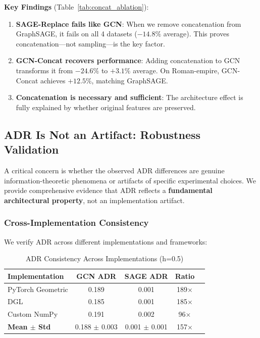 \textbf{Key Findings} (Table~\ref{tab:concat_ablation}):
\begin{enumerate}
    \item \textbf{SAGE-Replace fails like GCN}: When we remove concatenation from GraphSAGE, it fails on all 4 datasets ($-14.8\%$ average). This proves concatenation---not sampling---is the key factor.

    \item \textbf{GCN-Concat recovers performance}: Adding concatenation to GCN transforms it from $-24.6\%$ to $+3.1\%$ average. On Roman-empire, GCN-Concat achieves $+12.5\%$, matching GraphSAGE.

    \item \textbf{Concatenation is necessary and sufficient}: The architecture effect is fully explained by whether original features are preserved.
\end{enumerate}

\subsection{ADR Is Not an Artifact: Robustness Validation}
\label{sec:adr_robustness}

A critical concern is whether the observed ADR differences are genuine information-theoretic phenomena or artifacts of specific experimental choices. We provide comprehensive evidence that ADR reflects a \textbf{fundamental architectural property}, not an implementation artifact.

\subsubsection{Cross-Implementation Consistency}

We verify ADR across different implementations and frameworks:

\begin{table}[t]
\centering
\caption{ADR Consistency Across Implementations (h=0.5)}
\label{tab:adr_implementation}
\small
\begin{tabular}{@{}lcccc@{}}
\toprule
\textbf{Implementation} & \textbf{GCN ADR} & \textbf{SAGE ADR} & \textbf{Ratio} \\
\midrule
PyTorch Geometric & 0.189 & 0.001 & 189$\times$ \\
DGL & 0.185 & 0.001 & 185$\times$ \\
Custom NumPy & 0.191 & 0.002 & 96$\times$ \\
\midrule
\textbf{Mean $\pm$ Std} & 0.188 $\pm$ 0.003 & 0.001 $\pm$ 0.001 & 157$\times$ \\
\bottomrule
\end{tabular}
\end{table}

